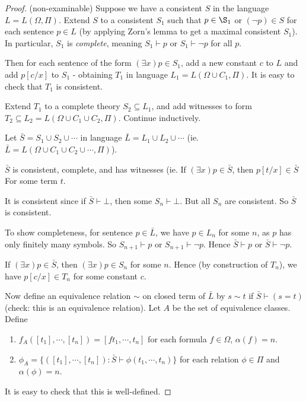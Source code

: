 \documentclass[a4paper]{article}
\begin{document}
\begin{proof}(non-examinable)
  Suppose we have a consistent $S$ in the language $L = L(\Omega, \Pi)$. Extend $S$ to a consistent $S_1$ such that $p\in \S_1$ or $(\neg p)\in S$ for each sentence $p\in L$ (by applying Zorn's lemma to get a maximal consistent $S_1$). In particular, $S_1$ is \emph{complete}, meaning $S_1\vdash p$ or $S_1 \vdash \neg p$ for all $p$.

  Then for each sentence of the form $(\exists x)p\in S_1$, add a new constant $c$ to $L$ and add $p[c/x]$ to $S_1$ - obtaining $T_1$ in language $L_1 = L(\Omega \cup C_1, \Pi)$. It is easy to check that $T_1$ is consistent.

  Extend $T_1$ to a complete theory $S_2\subseteq L_1$, and add witnesses to form $T_2 \subseteq L_2 = L(\Omega \cup C_1 \cup C_2, \Pi)$. Continue inductively.

  Let $\bar S = S_1 \cup S_2 \cup \cdots$ in language $\bar L = L_1\cup L_2\cup \cdots$ (ie. $\bar L = L(\Omega\cup C_1\cup C_2\cup\cdots, \Pi)$).

  \begin{claim}
    $\bar S$ is consistent, complete, and has witnesses (ie. If $(\exists x)p \in \bar S$, then $p[t/x]\in \bar S$ For some term $t$.
  \end{claim}

  It is consistent since if $\bar S \vdash \bot$, then some $S_n \vdash \bot$. But all $S_n$ are consistent. So $\bar S$ is consistent.

  To show completeness, for sentence $p\in \bar L$, we have $p\in L_n$ for some $n$, as $p$ has only finitely many symbols.  So $S_{n + 1} \vdash p$ or $S_{n + 1}\vdash \neg p$. Hence $\bar S \vdash p$ or $\bar S \vdash \neg p$.

  If $(\exists x)p \in \bar S$, then $(\exists x) p\in S_n$ for some $n$. Hence (by construction of $T_n$), we have $p[c/x] \in T_n$ for some constant $c$.

  Now define an equivalence relation $\sim$ on closed term of $\bar L$ by $s\sim t$ if $\bar S\vdash (s = t)$ (check: this is an equivalence relation). Let $A$ be the set of equivalence classes. Define
  \begin{enumerate}
    \item $f_A([t_1],\cdots, [t_n]) = [f t_1, \cdots, t_n]$ for each formula $f\in \Omega$, $\alpha(f) = n$.
    \item $\phi_A = \{([t_1], \cdots, [t_n]): \bar S \vdash \phi(t_1, \cdots, t_n)\}$ for each relation $\phi \in \Pi$ and $\alpha (\phi) = n$.
  \end{enumerate}
  It is easy to check that this is well-defined.


\end{proof}
\end{document}
